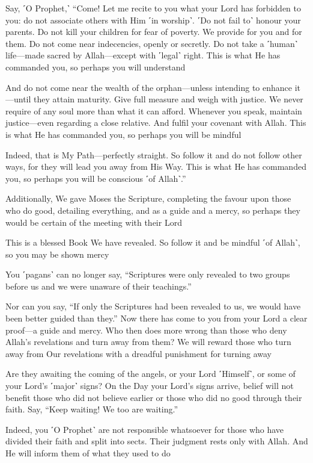 Say, ˹O Prophet,˺ “Come! Let me recite to you what your Lord has forbidden to you: do not associate others with Him ˹in worship˺. ˹Do not fail to˺ honour your parents. Do not kill your children for fear of poverty. We provide for you and for them. Do not come near indecencies, openly or secretly. Do not take a ˹human˺ life—made sacred by Allah—except with ˹legal˺ right. This is what He has commanded you, so perhaps you will understand

And do not come near the wealth of the orphan—unless intending to enhance it—until they attain maturity. Give full measure and weigh with justice. We never require of any soul more than what it can afford. Whenever you speak, maintain justice—even regarding a close relative. And fulfil your covenant with Allah. This is what He has commanded you, so perhaps you will be mindful

Indeed, that is My Path—perfectly straight. So follow it and do not follow other ways, for they will lead you away from His Way. This is what He has commanded you, so perhaps you will be conscious ˹of Allah˺.”

Additionally, We gave Moses the Scripture, completing the favour upon those who do good, detailing everything, and as a guide and a mercy, so perhaps they would be certain of the meeting with their Lord

This is a blessed Book We have revealed. So follow it and be mindful ˹of Allah˺, so you may be shown mercy

You ˹pagans˺ can no longer say, “Scriptures were only revealed to two groups before us and we were unaware of their teachings.”

Nor can you say, “If only the Scriptures had been revealed to us, we would have been better guided than they.” Now there has come to you from your Lord a clear proof—a guide and mercy. Who then does more wrong than those who deny Allah’s revelations and turn away from them? We will reward those who turn away from Our revelations with a dreadful punishment for turning away

Are they awaiting the coming of the angels, or your Lord ˹Himself˺, or some of your Lord’s ˹major˺ signs? On the Day your Lord’s signs arrive, belief will not benefit those who did not believe earlier or those who did no good through their faith. Say, “Keep waiting! We too are waiting.”

Indeed, you ˹O Prophet˺ are not responsible whatsoever for those who have divided their faith and split into sects. Their judgment rests only with Allah. And He will inform them of what they used to do

